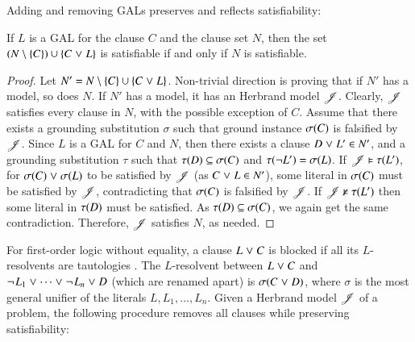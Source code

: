 Adding and removing GALs preserves and reflects satisfiability:

\begin{theorem}
   \label{thm:gal}
   If $L$ is a GAL for the clause $C$ and the clause set $N$, then the set $(N \setminus
   \{C\}) \cup\allowbreak \{ C \mathrel{\lor}\nobreak L \}$ is satisfiable if and only if $N$ is satisfiable.
\end{theorem}
\begin{rep}%
\begin{proof}
   Let $N' = N \setminus \{C\} \cup \{ C \mathrel{\lor} L \}$.
   Non-trivial direction is proving that if $N'$ has a model, so does
   $N.$ If $N'$ has a model, it has an Herbrand model $\mathscr{J}$. Clearly,
   $\mathscr{J}$ satisfies every clause in $N$, with the possible exception of
   $C$. Assume that there exists a grounding substitution $\sigma$ such that ground instance $\sigma(C)$ is falsified by
   $\mathscr{J}$. Since $L$ is a GAL for $C$ and $N$, then there exists a clause $D \mathrel{\lor} L' \in N'$, and a grounding substitution $\tau$ such that
   $\tau(D) \subseteq \sigma(C)$ and $\tau(\neg L') =
   \sigma(L)$. If $\mathscr{J} \vDash
   \tau(L')$, for $\sigma(C) \mathrel{\lor} \sigma(L)$ to be satisfied by $\mathscr{J}$ (as $C \mathrel{\lor} L \in N'$), some
   literal in $\sigma(C)$ must be satisfied by $\mathscr{J}$, contradicting that
   $\sigma(C)$ is falsified by $\mathscr{J}$. If $\mathscr{J} \nvDash \tau(L')$
   then some literal in $\tau(D)$ must be satisfied. As $\tau(D) \subseteq \sigma(C)$,
   we again get the same contradiction. Therefore, $\mathscr{J}$ satisfies $N$,
   as needed.
 \end{proof}

\end{rep}
For first-order logic without equality, a clause $L \mathrel{\lor} C$ is blocked if all its
$L$-resolvents are tautologies \cite{ksstb-2017-blockedfol}. The $L$-resolvent
between $L \mathrel{\lor} C$ and $\neg{\kern.2ex L_1} \mathrel{\lor} \cdots \mathrel{\lor} \neg{\kern.2ex L_n} \mathrel{\lor}
D$ (which are renamed apart) is $\sigma(C \mathrel{\lor} D)$, where $\sigma$ is the most general unifier
of the literals $L, L_1, \ldots, L_n$.
Given a Herbrand model $\mathscr{J}$ of a problem, the following procedure
removes all clauses while preserving satisfiability:

